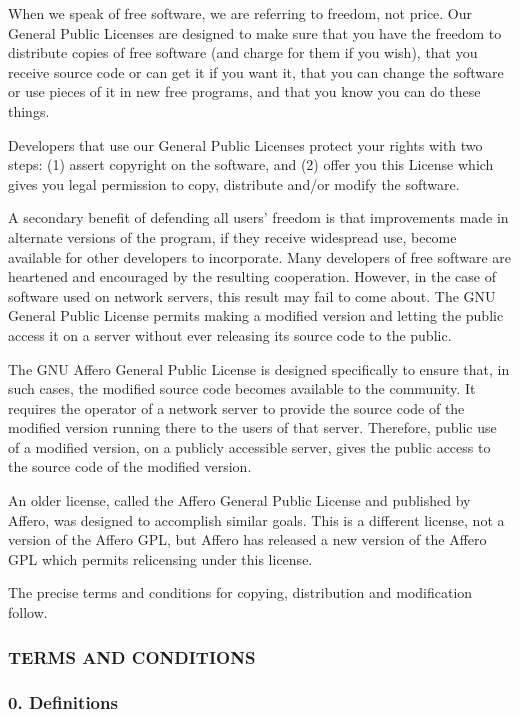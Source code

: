 \documentclass[a4paper, 11pt, twoside]{article}
\begin{document}
When we speak of free software, we are referring to freedom, not price. Our General Public Licenses are designed to make sure that you have the freedom to distribute copies of free software (and charge for them if you wish), that you receive source code or can get it if you want it, that you can change the software or use pieces of it in new free programs, and that you know you can do these things.

Developers that use our General Public Licenses protect your rights with two steps: (1) assert copyright on the software, and (2) offer you this License which gives you legal permission to copy, distribute and/or modify the software.

A secondary benefit of defending all users' freedom is that improvements made in alternate versions of the program, if they receive widespread use, become available for other developers to incorporate. Many developers of free software are heartened and encouraged by the resulting cooperation. However, in the case of software used on network servers, this result may fail to come about. The GNU General Public License permits making a modified version and letting the public access it on a server without ever releasing its source code to the public.

The GNU Affero General Public License is designed specifically to ensure that, in such cases, the modified source code becomes available to the community. It requires the operator of a network server to provide the source code of the modified version running there to the users of that server. Therefore, public use of a modified version, on a publicly accessible server, gives the public access to the source code of the modified version.

An older license, called the Affero General Public License and published by Affero, was designed to accomplish similar goals. This is a different license, not a version of the Affero GPL, but Affero has released a new version of the Affero GPL which permits relicensing under this license.

The precise terms and conditions for copying, distribution and modification follow.

\subsubsection{TERMS AND CONDITIONS}

\subsubsection{0. Definitions}
\end{document}
